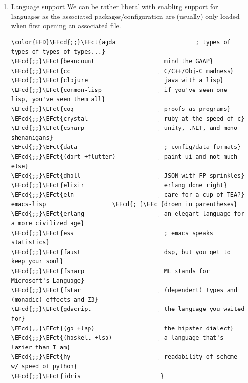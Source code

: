 \documentclass{scrartcl}
\newcommand{\EFb}[1]{\textcolor{EFb}{#1}} %
\newcommand{\EFct}[1]{\textcolor{EFct}{#1}} %
\newcommand{\EFv}[1]{\textcolor{EFv}{#1}} %
\newcommand{\EFcd}[1]{\textcolor{EFcd}{#1}} %
\newcommand{\EFrdi}[1]{\textcolor{EFrdi}{#1}} %
\begin{document}
\begin{enumerate}
\begin{Code}
\begin{Verbatim}[]
\color{EFD}\EFrdi{(}\EFb{:if} \EFv{IS-MAC} macos\EFrdi{)}  \EFcd{; }\EFct{improve compatibility with macOS}
tty                          \EFcd{; }\EFct{improve the terminal Emacs experience}
\end{Verbatim}
\end{Code}

\item Language support
\label{sec:orged25d27}
We can be rather liberal with enabling support for languages as the associated
packages/configuration are (usually) only loaded when first opening an
associated file.

\begin{Code}
\begin{Verbatim}[]
\color{EFD}\EFcd{;;}\EFct{agda                       ; types of types of types of types...}
\EFcd{;;}\EFct{beancount                  ; mind the GAAP}
\EFcd{;;}\EFct{cc                         ; C/C++/Obj-C madness}
\EFcd{;;}\EFct{clojure                    ; java with a lisp}
\EFcd{;;}\EFct{common-lisp                ; if you've seen one lisp, you've seen them all}
\EFcd{;;}\EFct{coq                        ; proofs-as-programs}
\EFcd{;;}\EFct{crystal                    ; ruby at the speed of c}
\EFcd{;;}\EFct{csharp                     ; unity, .NET, and mono shenanigans}
\EFcd{;;}\EFct{data                         ; config/data formats}
\EFcd{;;}\EFct{(dart +flutter)            ; paint ui and not much else}
\EFcd{;;}\EFct{dhall                      ; JSON with FP sprinkles}
\EFcd{;;}\EFct{elixir                     ; erlang done right}
\EFcd{;;}\EFct{elm                        ; care for a cup of TEA?}
emacs-lisp                   \EFcd{; }\EFct{drown in parentheses}
\EFcd{;;}\EFct{erlang                     ; an elegant language for a more civilized age}
\EFcd{;;}\EFct{ess                          ; emacs speaks statistics}
\EFcd{;;}\EFct{faust                      ; dsp, but you get to keep your soul}
\EFcd{;;}\EFct{fsharp                     ; ML stands for Microsoft's Language}
\EFcd{;;}\EFct{fstar                      ; (dependent) types and (monadic) effects and Z3}
\EFcd{;;}\EFct{gdscript                   ; the language you waited for}
\EFcd{;;}\EFct{(go +lsp)                  ; the hipster dialect}
\EFcd{;;}\EFct{(haskell +lsp)             ; a language that's lazier than I am}
\EFcd{;;}\EFct{hy                         ; readability of scheme w/ speed of python}
\EFcd{;;}\EFct{idris                      ;}

\end{Verbatim}
\end{Code}
\end{enumerate}
\end{document}
